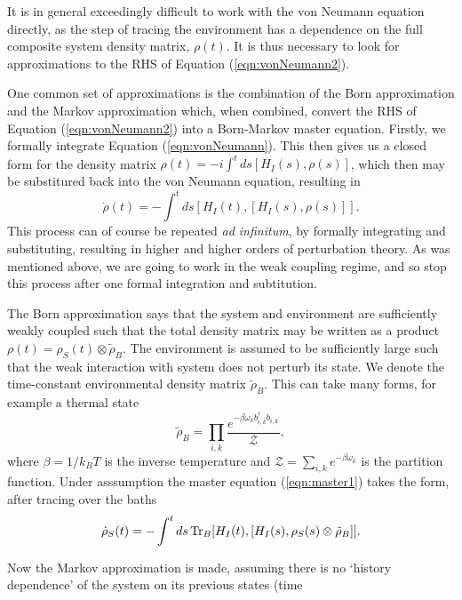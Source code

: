 \documentclass[11pt,a4paper,article,oneside]{memoir}
\begin{document}
It is in general exceedingly difficult to work with the von Neumann
equation directly, as the step of tracing the environment has a
dependence on the full composite system density matrix, $\rho(t)$. It
is thus necessary to look for approximations to the RHS of Equation
(\ref{eqn:vonNeumann2}).  \par One common set of approximations is the
combination of the Born approximation and the Markov approximation
which, when combined, convert the RHS of Equation
(\ref{eqn:vonNeumann2}) into a Born-Markov master equation. Firstly,
we formally integrate Equation (\ref{eqn:vonNeumann}). This then gives
us a closed form for the density matrix
$\rho(t)=-i\int^tds[H_I(s),\rho(s)]$, which then may be substitured
back into the von Neumann equation, resulting in
\begin{equation}
  \dot{\rho}(t)=-\int^tds[H_I(t),[H_I(s),\rho(s)]].
  \label{eqn:master1}
\end{equation}
This process can of course be repeated \textit{ad infinitum}, by
formally integrating and substituting, resulting in higher and higher
orders of perturbation theory. As was mentioned above, we are going to
work in the weak coupling regime, and so stop this process after one
formal integration and subtitution.  \par The Born approximation says
that the system and environment are sufficiently weakly coupled such
that the total density matrix may be written as a product
$\rho(t)=\rho_S(t)\otimes\tilde{\rho}_B$. The environment is assumed
to be sufficiently large such that the weak interaction with system
does not perturb its state. We denote the time-constant environmental
density matrix $\tilde{\rho}_B$. This can take many forms, for example
a thermal state
\begin{equation}
  \tilde{\rho}_B=\prod_{i,k}\frac{e^{-\beta\omega_{k}
      b^\dagger_{i,k}b_{i,k}}}{\mathcal{Z}},
      \label{eqn:thermal}
\end{equation}
where $\beta=1/k_BT$ is the inverse temperature and
$\mathcal{Z}=\sum_{i,k}e^{-\beta\omega_k}$ is the partition
function. Under asssumption the master equation (\ref{eqn:master1})
takes the form, after tracing over the baths
\begin{equation}
  \dot{\rho}_S(t)=-\int^tds\operatorname{Tr}_B[H_I(t),[H_I(s),\rho_S(s)\otimes\tilde{\rho}_B]].
\end{equation}
\par Now the Markov approximation is made, assuming there is no
`history dependence' of the system on its previous states (time
\end{document}

